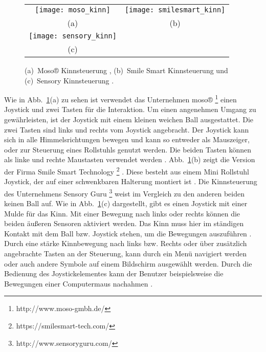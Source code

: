 \begin{figure}
\centering\small
\setlength{\tabcolsep}{0mm}	%
\begin{tabular}{c@{\hspace{15mm}}c} %
  \texttt{[image: moso\_kinn]} &
  \texttt{[image: smilesmart\_kinn]}
\\
  (a) & (b)
\\[5pt]	%
  \texttt{[image: sensory\_kinn]}
\\
  (c)
\end{tabular}
%
\caption{(a)~Moso® Kinnsteuerung \cite{MOSO}, (b)~Smile Smart Kinnsteuerung \cite{SMILESMART} und (c)~Sensory Kinnsteuerung \cite{SENSORY}.}
\label{fig:kinn}
\end{figure}
Wie in Abb.~\ref{fig:kinn}(a) zu sehen ist verwendet das Unternehmen moso® %
\footnote{http://www.moso-gmbh.de/}
%
einen Joystick und zwei Tasten für die Interaktion. Um einen angenehmen Umgang zu gewährleisten, ist der Joystick mit einem kleinen weichen Ball ausgestattet. Die zwei Tasten sind links und rechts vom Joystick angebracht. Der Joystick kann sich in alle Himmelsrichtungen bewegen und kann so entweder als Mauszeiger, oder zur Steuerung eines Rollstuhls genutzt werden. Die beiden Tasten können als linke und rechte Maustasten verwendet werden \cite{MOSO}.
\newline
Abb.~\ref{fig:kinn}(b) zeigt die Version der Firma Smile Smart Technology %
\footnote{https://smilesmart-tech.com/}
%
. Diese besteht aus einem Mini Rollstuhl Joystick, der auf einer schwenkbaren Halterung montiert ist \cite{SMILESMART}.
\newline
Die Kinnsteuerung des Unternehmens Sensory Guru %
\footnote{http://www.sensoryguru.com/}
%
weist im Vergleich zu den anderen beiden keinen Ball auf. Wie in Abb.~\ref{fig:kinn}(c) dargestellt, gibt es einen Joystick mit einer Mulde für das Kinn. Mit einer Bewegung nach links oder rechts können die beiden äußeren Sensoren aktiviert werden. Das Kinn muss hier im ständigen Kontakt mit dem Ball bzw. Joystick stehen, um die Bewegungen auszuführen \cite{SENSORY}. 
\newline \newline
Durch eine stärke Kinnbewegung nach links bzw. Rechts oder über zusätzlich angebrachte Tasten an der Steuerung, kann durch ein Menü navigiert werden oder auch andere Symbole auf einem Bildschirm ausgewählt werden. Durch die Bedienung des Joystickelementes kann der Benutzer beispielsweise die Bewegungen einer Computermaus nachahmen \cite{MOSO} \cite{SENSORY}. 
